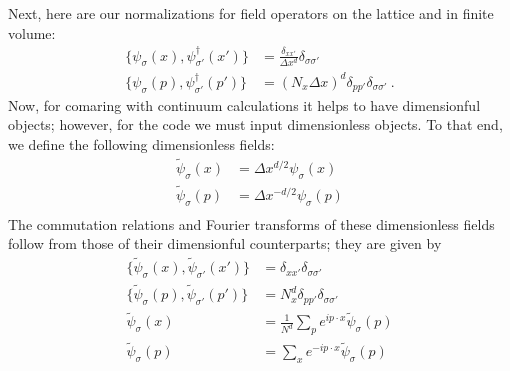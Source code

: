Next, here are our normalizations for field operators on the lattice and in finite volume:
\begin{align}
\{ \psi_{\sigma}(x) , \psi^{\dagger}_{\sigma'}(x') \} & = \frac{\delta_{x x'}}{\Delta x^d} \delta_{\sigma \sigma'} \\
\{ \psi_{\sigma}(p) , \psi^{\dagger}_{\sigma'}(p') \} & = (N_x \Delta x)^d \delta_{p p'}\delta_{\sigma \sigma'} ~.
\end{align} 
Now, for comaring with continuum calculations it helps to have dimensionful objects; however, for the code we must input
dimensionless objects. To that end, we define the following dimensionless fields:
\begin{align}
\tilde{\psi}_{\sigma}(x) & = \Delta x^{d/2} \psi_{\sigma}(x) \\
\tilde{\psi}_{\sigma}(p) & = \Delta x^{-d/2} \psi_{\sigma}(p) \\
\end{align}
The commutation relations and Fourier transforms of these dimensionless fields follow from those of their dimensionful counterparts; they are given by
\begin{align}
\{\tilde{\psi}_{\sigma}(x),\tilde{\psi}_{\sigma'}(x')\} & = \delta_{x x'} \delta_{\sigma \sigma'} \\
\{\tilde{\psi}_{\sigma}(p),\tilde{\psi}_{\sigma'}(p')\} & = N_x^d \delta_{p p'} \delta_{\sigma \sigma'} \\
\tilde{\psi}_{\sigma}(x) & = \frac{1}{N^d} \sum_p e^{i p \cdot x} \tilde{\psi}_{\sigma}(p) \\
\tilde{\psi}_{\sigma}(p) & =  \sum_x e^{-i p \cdot x} \tilde{\psi}_{\sigma}(p) 
\end{align}
